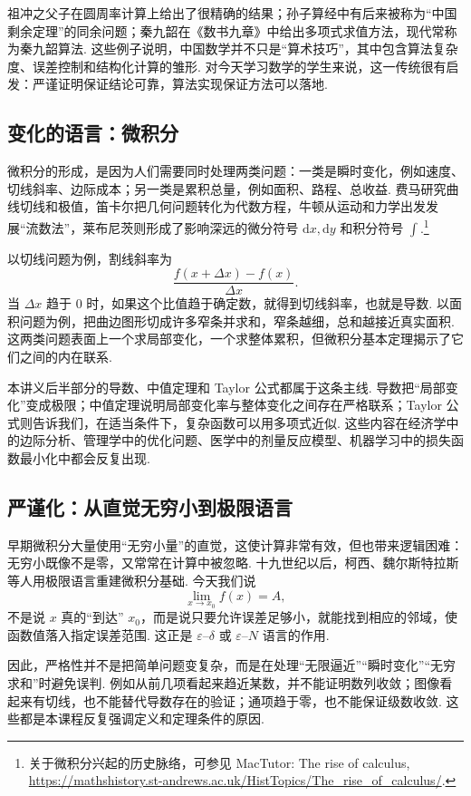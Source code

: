 \documentclass[fontset=fandol]{ctexart}
\newcommand{\dd}{\mathrm{d}}
\begin{document}
祖冲之父子在圆周率计算上给出了很精确的结果；孙子算经中有后来被称为“中国剩余定理”的同余问题；秦九韶在《数书九章》中给出多项式求值方法，现代常称为秦九韶算法. 这些例子说明，中国数学并不只是“算术技巧”，其中包含算法复杂度、误差控制和结构化计算的雏形. 对今天学习数学的学生来说，这一传统很有启发：严谨证明保证结论可靠，算法实现保证方法可以落地.

\subsection{变化的语言：微积分}

微积分的形成，是因为人们需要同时处理两类问题：一类是瞬时变化，例如速度、切线斜率、边际成本；另一类是累积总量，例如面积、路程、总收益. 费马研究曲线切线和极值，笛卡尔把几何问题转化为代数方程，牛顿从运动和力学出发发展“流数法”，莱布尼茨则形成了影响深远的微分符号 $\dd x,\dd y$ 和积分符号 $\int$.\footnote{关于微积分兴起的历史脉络，可参见 MacTutor: The rise of calculus, \url{https://mathshistory.st-andrews.ac.uk/HistTopics/The_rise_of_calculus/}.}

以切线问题为例，割线斜率为
\[
\frac{f(x+\Delta x)-f(x)}{\Delta x}.
\]
当 $\Delta x$ 趋于 $0$ 时，如果这个比值趋于确定数，就得到切线斜率，也就是导数. 以面积问题为例，把曲边图形切成许多窄条并求和，窄条越细，总和越接近真实面积. 这两类问题表面上一个求局部变化，一个求整体累积，但微积分基本定理揭示了它们之间的内在联系.

本讲义后半部分的导数、中值定理和 Taylor 公式都属于这条主线. 导数把“局部变化”变成极限；中值定理说明局部变化率与整体变化之间存在严格联系；Taylor 公式则告诉我们，在适当条件下，复杂函数可以用多项式近似. 这些内容在经济学中的边际分析、管理学中的优化问题、医学中的剂量反应模型、机器学习中的损失函数最小化中都会反复出现.

\subsection{严谨化：从直觉无穷小到极限语言}

早期微积分大量使用“无穷小量”的直觉，这使计算非常有效，但也带来逻辑困难：无穷小既像不是零，又常常在计算中被忽略. 十九世纪以后，柯西、魏尔斯特拉斯等人用极限语言重建微积分基础. 今天我们说
\[
\lim_{x\to x_0}f(x)=A,
\]
不是说 $x$ 真的“到达” $x_0$，而是说只要允许误差足够小，就能找到相应的邻域，使函数值落入指定误差范围. 这正是 $\varepsilon$--$\delta$ 或 $\varepsilon$--$N$ 语言的作用.

因此，严格性并不是把简单问题变复杂，而是在处理“无限逼近”“瞬时变化”“无穷求和”时避免误判. 例如从前几项看起来趋近某数，并不能证明数列收敛；图像看起来有切线，也不能替代导数存在的验证；通项趋于零，也不能保证级数收敛. 这些都是本课程反复强调定义和定理条件的原因.
\end{document}
